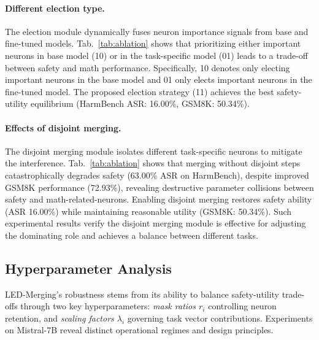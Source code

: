 \paragraph{Different election type.}
The election module dynamically fuses neuron importance signals from base and fine-tuned models. Tab.~\ref{tab:ablation} shows that prioritizing either important neurons in base model (10) or in the task-specific model (01) leads to a trade-off between safety and math performance. Specifically, 10 denotes only electing important neurons in the base model and 01 only elects important neurons in the fine-tuned model. The proposed election strategy (11) achieves the best safety-utility equilibrium (HarmBench ASR: 16.00\%, GSM8K: 50.34\%).


\paragraph{Effects of disjoint merging.}
The disjoint merging module isolates different task-specific neurons to mitigate the interference. Tab.~\ref{tab:ablation} shows that merging without disjoint steps catastrophically degrades safety (63.00\% ASR on HarmBench), despite improved GSM8K performance (72.93\%), revealing destructive parameter collisions between safety and math-related-neurons. 
Enabling disjoint merging restores safety ability (ASR 16.00\%) while maintaining reasonable utility (GSM8K: 50.34\%). Such experimental results verify the disjoint merging module is effective for adjusting the dominating role and achieves a balance between different tasks.


\subsection{Hyperparameter Analysis}
LED-Merging’s robustness stems from its ability to balance safety-utility trade-offs through two key hyperparameters: \textit{mask ratios \(r_i\)} controlling neuron retention, and \textit{scaling factors \(\lambda_i\)} governing task vector contributions. Experiments on Mistral-7B reveal distinct operational regimes and design principles.


